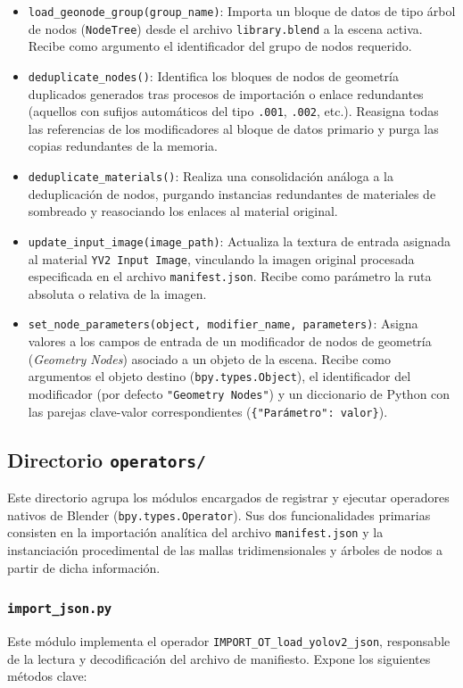 \begin{itemize}
    \item \texttt{load\_geonode\_group(group\_name)}: Importa un bloque de datos de tipo árbol de nodos (\texttt{NodeTree}) desde el archivo 
    \texttt{library.blend} a la escena activa. Recibe como argumento el identificador del grupo de nodos requerido.
    \item \texttt{deduplicate\_nodes()}: Identifica los bloques de nodos de geometría duplicados generados tras procesos de importación o 
    enlace redundantes (aquellos con sufijos automáticos del tipo \texttt{.001}, \texttt{.002}, etc.). Reasigna todas las referencias de 
    los modificadores al bloque de datos primario y purga las copias redundantes de la memoria.
    \item \texttt{deduplicate\_materials()}: Realiza una consolidación análoga a la deduplicación de nodos, purgando instancias redundantes 
    de materiales de sombreado y reasociando los enlaces al material original.
    \item \texttt{update\_input\_image(image\_path)}: Actualiza la textura de entrada asignada al material \texttt{YV2 Input Image}, vinculando 
    la imagen original procesada especificada en el archivo \texttt{manifest.json}. Recibe como parámetro la ruta absoluta o relativa de la imagen.
    \item \texttt{set\_node\_parameters(object, modifier\_name, parameters)}: Asigna valores a los campos de entrada de un modificador de nodos 
    de geometría (\textit{Geometry Nodes}) asociado a un objeto de la escena. Recibe como argumentos el objeto destino (\texttt{bpy.types.Object}), 
    el identificador del modificador (por defecto \texttt{"Geometry Nodes"}) y un diccionario de Python con las parejas clave-valor correspondientes 
    (\texttt{\{"Parámetro": valor\}}).
\end{itemize}

\subsection{Directorio \texttt{operators/}}
Este directorio agrupa los módulos encargados de registrar y ejecutar operadores nativos de Blender (\texttt{bpy.types.Operator}). Sus dos 
funcionalidades primarias consisten en la importación analítica del archivo \texttt{manifest.json} y la instanciación procedimental de las mallas 
tridimensionales y árboles de nodos a partir de dicha información.

\subsubsection{\texttt{import\_json.py}}
Este módulo implementa el operador \texttt{IMPORT\_OT\_load\_yolov2\_json}, responsable de la lectura y decodificación del archivo de manifiesto. 
Expone los siguientes métodos clave:

